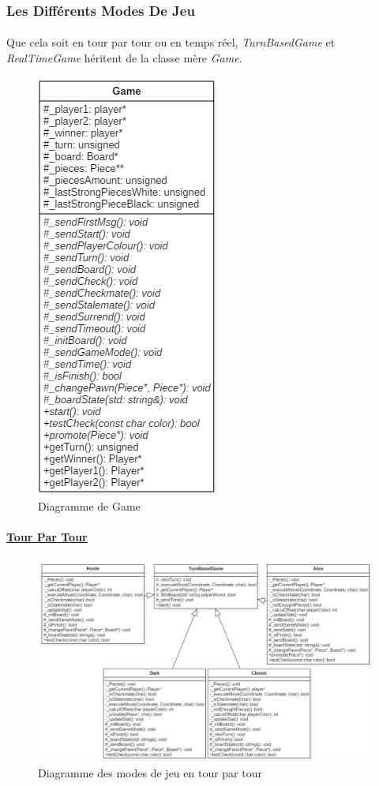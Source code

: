 \documentclass[10pt, a4paper]{article}
\begin{document}
\subsubsection{Les Différents Modes De Jeu}
\paragraph{}Que cela soit en tour par tour ou en temps réel, \textit{TurnBasedGame} et \textit{RealTimeGame} héritent de la classe mère \textit{Game}.
\begin{figure}[H]
\centering
\includegraphics[scale=0.5]{game_diagram.png}
\caption{Diagramme de Game}
\end{figure}


\paragraph{\underline{Tour Par Tour}}
\begin{figure}[H]
\centering
\includegraphics[scale=0.5]{mode_chess.png}
\caption{Diagramme des modes de jeu en tour par tour}
\end{figure}
\end{document}
